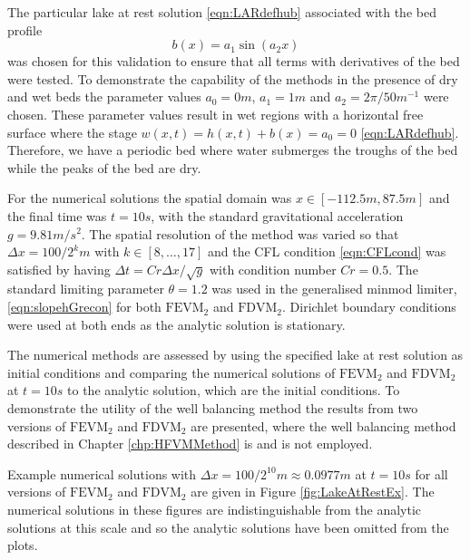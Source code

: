 The particular lake at rest solution \eqref{eqn:LARdefhub} associated with the bed profile
\begin{equation}
b(x) = a_1 \sin\left(a_2 x\right)
\end{equation}
was chosen for this validation to ensure that all terms with derivatives of the bed were tested. To demonstrate the capability of the methods in the presence of dry and wet beds the parameter values $a_0 = 0m$, $a_1 = 1m$ and $a_2 = 2 \pi / 50 m^{-1} $ were chosen. These parameter values result in wet regions with a horizontal free surface where the stage $w(x,t)= h(x,t) + b(x) =a_0= 0$ \eqref{eqn:LARdefhub}. Therefore, we have a periodic bed where water submerges the troughs of the bed while the peaks of the bed are dry. 

For the numerical solutions the spatial domain was $x \in \left[-112.5 m,87.5 m\right]$ and the final time was $t=10s$, with the standard gravitational acceleration $g= 9.81 m/s^2$. The spatial resolution of the method was varied so that $\Delta x = 100 / 2^k m$ with $k \in \left[8, \dots  ,17\right]$ and the CFL condition \eqref{eqn:CFLcond} was satisfied by having $\Delta t = Cr \Delta x / \sqrt{g}$ with condition number $Cr = 0.5$. The standard limiting parameter $\theta = 1.2$ was used in the generalised minmod limiter, \eqref{eqn:slopehGrecon} for both $\text{FEVM}_2$ and $\text{FDVM}_2$. Dirichlet boundary conditions were used at both ends as the analytic solution is stationary.

The numerical methods are assessed by using the specified lake at rest solution as initial conditions and comparing the numerical solutions of $\text{FEVM}_2$ and $\text{FDVM}_2$ at $t=10s$ to the analytic solution, which are the initial conditions. To demonstrate the utility of the well balancing method the results from two versions of $\text{FEVM}_2$ and $\text{FDVM}_2$ are presented, where the well balancing method described in Chapter \ref{chp:HFVMMethod} is and is not employed.   

Example numerical solutions with $\Delta x = 100/2^{10}m \approx 0.0977m$ at $t=10s$ for all versions of $\text{FEVM}_2$ and $\text{FDVM}_2$ are given in Figure \ref{fig:LakeAtRestEx}. The numerical solutions in these figures are indistinguishable from the analytic solutions at this scale and so the analytic solutions have been omitted from the plots.  


